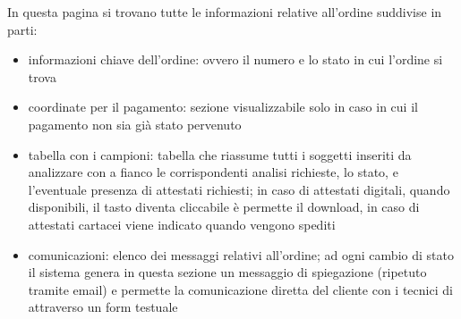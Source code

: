 In questa pagina si trovano tutte le informazioni relative all'ordine suddivise in parti:
\begin{itemize}
 \item informazioni chiave dell'ordine: ovvero il numero e lo stato in cui l'ordine si trova
 \item coordinate per il pagamento: sezione visualizzabile solo in caso in cui il pagamento non sia già stato pervenuto
 \item tabella con i campioni: tabella che riassume tutti i soggetti inseriti da analizzare con a fianco le corrispondenti analisi richieste, lo stato, e l'eventuale presenza di attestati richiesti; in caso di attestati digitali, quando disponibili, il tasto diventa cliccabile è permette il download, in caso di attestati cartacei viene indicato quando vengono spediti
 \item comunicazioni: elenco dei messaggi relativi all'ordine; ad ogni cambio di stato il sistema genera in questa sezione un messaggio di spiegazione (ripetuto tramite email) e permette la comunicazione diretta del cliente con i tecnici di {\fem} attraverso un form testuale
\end{itemize}
